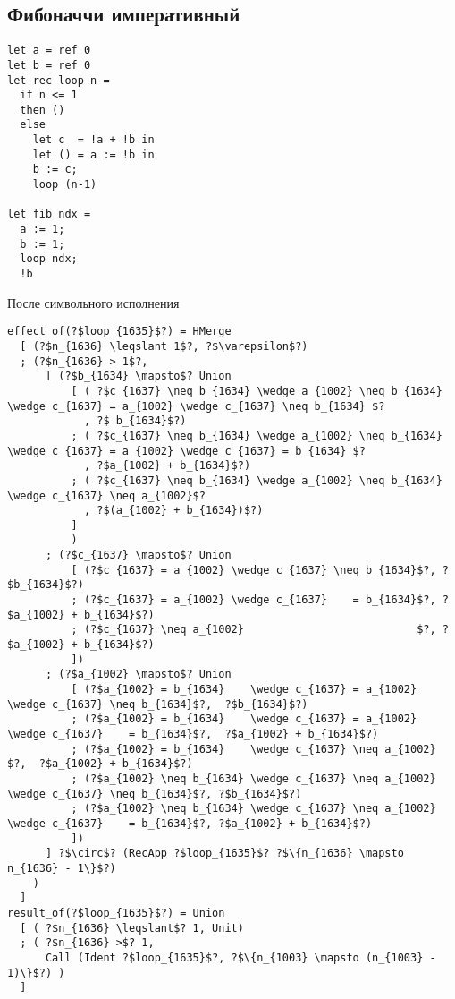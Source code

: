 \documentclass{article}
\begin{document}
\subsection{Фибоначчи императивный}
\begin{verbatim}  
let a = ref 0
let b = ref 0
let rec loop n = 
  if n <= 1
  then ()
  else 
    let c  = !a + !b in 
    let () = a := !b in
    b := c;
    loop (n-1) 
 
let fib ndx = 
  a := 1;
  b := 1;
  loop ndx;
  !b
\end{verbatim}
После символьного исполнения
\begin{verbatim}
effect_of(?$loop_{1635}$?) = HMerge 
  [ (?$n_{1636} \leqslant 1$?, ?$\varepsilon$?)
  ; (?$n_{1636} > 1$?,
      [ (?$b_{1634} \mapsto$? Union
          [ ( ?$c_{1637} \neq b_{1634} \wedge a_{1002} \neq b_{1634} \wedge c_{1637} = a_{1002} \wedge c_{1637} \neq b_{1634} $?
            , ?$ b_{1634}$?)
          ; ( ?$c_{1637} \neq b_{1634} \wedge a_{1002} \neq b_{1634} \wedge c_{1637} = a_{1002} \wedge c_{1637} = b_{1634} $?
            , ?$a_{1002} + b_{1634}$?)
          ; ( ?$c_{1637} \neq b_{1634} \wedge a_{1002} \neq b_{1634} \wedge c_{1637} \neq a_{1002}$?
            , ?$(a_{1002} + b_{1634})$?)
          ]
          )
      ; (?$c_{1637} \mapsto$? Union
          [ (?$c_{1637} = a_{1002} \wedge c_{1637} \neq b_{1634}$?, ?$b_{1634}$?)
          ; (?$c_{1637} = a_{1002} \wedge c_{1637}    = b_{1634}$?, ?$a_{1002} + b_{1634}$?)
          ; (?$c_{1637} \neq a_{1002}                           $?, ?$a_{1002} + b_{1634}$?)
          ])
      ; (?$a_{1002} \mapsto$? Union
          [ (?$a_{1002} = b_{1634}    \wedge c_{1637} = a_{1002}   \wedge c_{1637} \neq b_{1634}$?,  ?$b_{1634}$?)
          ; (?$a_{1002} = b_{1634}    \wedge c_{1637} = a_{1002}   \wedge c_{1637}    = b_{1634}$?,  ?$a_{1002} + b_{1634}$?)
          ; (?$a_{1002} = b_{1634}    \wedge c_{1637} \neq a_{1002}                             $?,  ?$a_{1002} + b_{1634}$?)
          ; (?$a_{1002} \neq b_{1634} \wedge c_{1637} \neq a_{1002} \wedge c_{1637} \neq b_{1634}$?, ?$b_{1634}$?)
          ; (?$a_{1002} \neq b_{1634} \wedge c_{1637} \neq a_{1002} \wedge c_{1637}    = b_{1634}$?, ?$a_{1002} + b_{1634}$?)
          ])
      ] ?$\circ$? (RecApp ?$loop_{1635}$? ?$\{n_{1636} \mapsto n_{1636} - 1\}$?)
    )
  ]
result_of(?$loop_{1635}$?) = Union 
  [ ( ?$n_{1636} \leqslant$? 1, Unit)     
  ; ( ?$n_{1636} >$? 1,
      Call (Ident ?$loop_{1635}$?, ?$\{n_{1003} \mapsto (n_{1003} - 1)\}$?) )
  ]
\end{verbatim}
\end{document}
